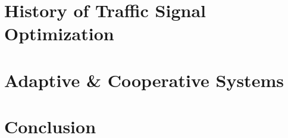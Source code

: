 \documentclass [a4paper, 11pt, titlepage] {article}
\begin{document}
\section{History of Traffic Signal Optimization}


\section{Adaptive \& Cooperative Systems}


\clearpage
\pagebreak

\section{Conclusion}


\clearpage
\newpage




\clearpage
\newpage
\appendix
\end{document}

